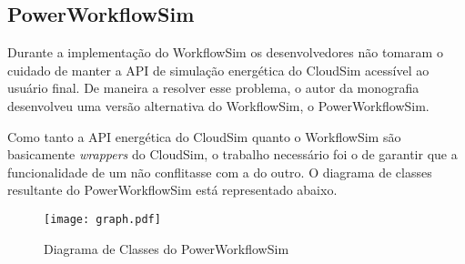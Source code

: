 \subsection{PowerWorkflowSim}
Durante a implementação do WorkflowSim os desenvolvedores não tomaram o cuidado
de manter a API de simulação energética do CloudSim acessível ao usuário final.
De maneira a resolver esse problema, o autor da monografia desenvolveu uma versão
alternativa do WorkflowSim, o PowerWorkflowSim.

Como tanto a API energética do CloudSim quanto o WorkflowSim são basicamente 
\emph{wrappers} do CloudSim, o trabalho necessário foi o de garantir que 
a funcionalidade de um não conflitasse com a do outro. O diagrama de classes
resultante do PowerWorkflowSim está representado abaixo.

\begin{figure}[ht]
\centering
\texttt{[image: graph.pdf]}
\caption{Diagrama de Classes do PowerWorkflowSim}
\label{fig:classes_powerworkflowsim}
\end{figure}


